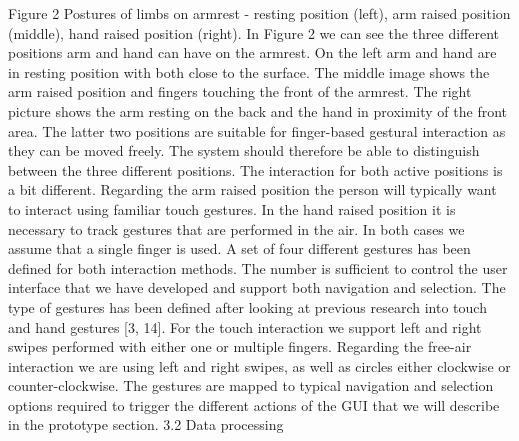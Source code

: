Figure 2 Postures of limbs on armrest - resting position (left),  arm raised position (middle), hand raised position (right).
In Figure 2 we can see the three different positions arm and hand can have on the armrest. On the left arm and hand are in resting position with both close to the surface. The middle image shows the arm raised position and fingers touching the front of the armrest. The right picture shows the arm resting on the back and the hand in proximity of the front area. The latter two positions are suitable for finger-based gestural interaction as they can be moved freely. The system should therefore be able to distinguish between the three different positions.
The interaction for both active positions is a bit different. Regarding the arm raised position the person will typically want to interact using familiar touch gestures. In the hand raised position it is necessary to track gestures that are performed in the air. In both cases we assume that a single finger is used. A set of four different gestures has been defined for both interaction methods. The number is sufficient to control the user interface that we have developed and support both navigation and selection. The type of gestures has been defined after looking at previous research into touch and hand gestures [3, 14]. For the touch interaction we support left and right swipes performed with either one or multiple fingers. Regarding the free-air interaction we are using left and right swipes, as well as circles either clockwise or counter-clockwise. The gestures are mapped to typical navigation and selection options required to trigger the different actions of the GUI that we will describe in the prototype section.
3.2	Data processing
 
